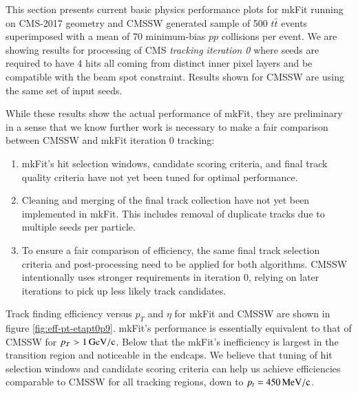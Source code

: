\documentclass{webofc}
\def\mkfit{mkFit\xspace}
\def\MeVoc{\ensuremath{\,\rm{M}e\rm{V}/c}}
\def\GeVoc{\ensuremath{\,\rm{G}e\rm{V}/c}}
\begin{document}
This section presents current basic physics performance plots for \mkfit
running on CMS-2017 geometry and CMSSW generated sample of 500 $t\bar{t}$
events superimposed with a mean of 70 minimum-bias $pp$ collisions per event. 
We are showing
results for processing of CMS \emph{tracking iteration 0} where seeds are
required to have 4 hits all coming from distinct inner pixel layers and be
compatible with the beam spot constraint. Results shown for CMSSW are using
the same set of input seeds.

While these results show the actual performance of \mkfit, they are
preliminary in a sense that we know further work is necessary to make a fair
comparison between CMSSW and \mkfit iteration 0 tracking:
\begin{enumerate}[--]\topsep-2pt\itemsep-2pt
\item \mkfit's hit selection windows, candidate scoring criteria, and final track
  quality criteria have not yet been tuned for optimal performance.
\item Cleaning and merging of the final track collection have not yet been
  implemented in \mkfit. This includes removal of duplicate tracks due to
  multiple seeds per particle.
\item To ensure a fair comparison of efficiency, the same final track selection
  criteria and post-processing need to be applied for both algorithms. CMSSW
  intentionally uses stronger requirements in iteration 0, relying on later
  iterations to pick up less likely track candidates.
\end{enumerate}

Track finding efficiency versus $p_T$ and $\eta$ for \mkfit and CMSSW are shown
in figure \ref{fig:eff-pt-etapt0p9}. \mkfit's performance is essentially
equivalent to that of CMSSW for $p_T > 1\GeVoc$. Below that the \mkfit's
inefficiency is largest in the transition region and noticeable in the
endcaps. We believe that tuning of hit selection windows and candidate scoring
criteria can help us achieve efficiencies comparable to CMSSW for all tracking
regions, down to $p_t = 450\MeVoc$.
\end{document}
